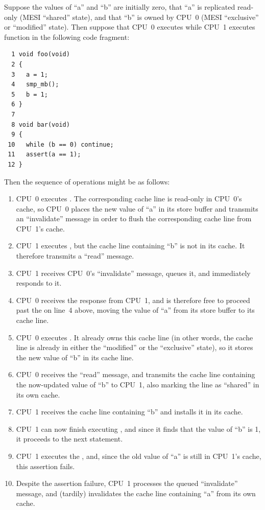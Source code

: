 Suppose the values of ``a'' and ``b'' are initially zero,
that ``a'' is replicated read-only (MESI ``shared'' state),
and that ``b''
is owned by CPU~0 (MESI ``exclusive'' or ``modified'' state).
Then suppose that CPU~0 executes  while CPU~1 executes
function  in the following code fragment:

\vspace{5pt}
\begin{minipage}[t]{\columnwidth}
\small
\begin{verbatim}
  1 void foo(void)
  2 {
  3   a = 1;
  4   smp_mb();
  5   b = 1;
  6 }
  7
  8 void bar(void)
  9 {
 10   while (b == 0) continue;
 11   assert(a == 1);
 12 }
\end{verbatim}
\end{minipage}
\vspace{5pt}

Then the sequence of operations might be as follows:
\begin{enumerate}
\item	CPU~0 executes .  The corresponding
	cache line is read-only in
	CPU~0's cache, so CPU~0 places the new value of ``a'' in its
	store buffer and transmits an ``invalidate'' message in order
	to flush the corresponding cache line from CPU~1's cache.
\item	CPU~1 executes , but the cache line
	containing ``b'' is not in its cache.
	It therefore transmits a ``read'' message.
\item	CPU~1 receives CPU~0's ``invalidate'' message, queues it, and
	immediately responds to it.
\item	CPU~0 receives the response from CPU~1, and is therefore free
	to proceed past the  on line~4 above, moving
	the value of ``a'' from its store buffer to its cache line.
\item	CPU~0 executes .
	It already owns this cache line (in other words, the cache line
	is already in either the ``modified'' or the ``exclusive'' state),
	so it stores the new value of ``b'' in its cache line.
\item	CPU~0 receives the ``read'' message, and transmits the
	cache line containing the now-updated value of ``b''
	to CPU~1, also marking the line as ``shared'' in its own cache.
\item	CPU~1 receives the cache line containing ``b'' and installs
	it in its cache.
\item	CPU~1 can now finish executing ,
	and since it finds that the value of ``b'' is 1, it proceeds
	to the next statement.
\item	CPU~1 executes the , and, since the
	old value of ``a'' is still in CPU~1's cache,
	this assertion fails.
\item	Despite the assertion failure, CPU~1 processes the queued
	``invalidate'' message, and (tardily)
	invalidates the cache line containing ``a'' from its own cache.
\end{enumerate}

